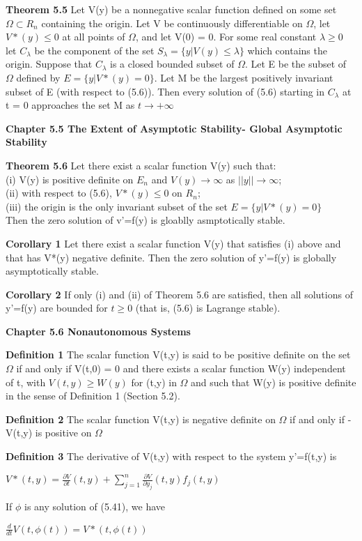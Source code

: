 \documentclass{article}
\begin{document}
\textbf {Theorem 5.5} Let V(y) be a nonnegative scalar function defined on some set $\Omega \subset R_n$ containing the origin. Let V be continuously differentiable on $\Omega$, let $V*(y) \leq 0$ at all points of $\Omega$, and let V(0) = 0. For some real constant $\lambda \geq 0$ let $C_\lambda$ be the component of the set $S_\lambda = \{y | V(y) \leq \lambda \}$ which contains the origin. Suppose that $C_\lambda$ is a closed bounded subset of $\Omega$. Let E be the subset of $\Omega$ defined by $E = \{ y | V*(y) = 0\}$. Let M be the largest positively invariant subset of E (with respect to (5.6)). Then every solution of (5.6) starting in $C_\lambda$ at t = 0 approaches the set M as $t \to + \infty$

\textbf {Chapter 5.5 The Extent of Asymptotic Stability- Global Asymptotic Stability}

\textbf {Theorem 5.6} Let there exist a scalar function V(y) such that: \\
(i) V(y) is positive definite on $E_n$ and $V(y) \to \infty$ as $||y|| \to \infty$; \\
(ii) with respect to (5.6), $V*(y) \leq 0$ on $R_n$; \\
(iii) the origin is the only invariant subset of the set $E = \{y|V*(y) = 0\}$ \\
Then the zero solution of v'=f(y) is gloablly asmptotically stable.

\textbf {Corollary 1} Let there exist a scalar function V(y) that satisfies (i) above and that has V*(y) negative definite. Then the zero solution of y'=f(y) is globally asymptotically stable. 

\textbf {Corollary 2} If only (i) and (ii) of Theorem 5.6 are satisfied, then all solutions of y'=f(y) are bounded for $t \geq 0$ (that is, (5.6) is Lagrange stable).

\textbf {Chapter 5.6 Nonautonomous Systems}

\textbf {Definition 1} The scalar function V(t,y) is said to be positive definite on the set $\Omega$ if and only if V(t,0) = 0 and there exists a scalar function W(y) independent of t, with $V(t,y) \geq W(y)$ for (t,y) in $\Omega$ and such that W(y) is positive definite in the sense of Definition 1 (Section 5.2).

\textbf {Definition 2} The scalar function V(t,y) is negative definite on $\Omega$ if and only if -V(t,y) is positive on $\Omega$

\textbf {Definition 3} The derivative of V(t,y) with respect to the system y'=f(t,y) is 
\begin{center}
$V*(t,y) = \frac{\partial V}{\partial t} (t,y) + \sum_{j=1}^n \frac{\partial V}{\partial y_j} (t,y) f_j(t,y)$
\end{center}
If $\phi$ is any solution of (5.41), we have
\begin{center}
$\frac{d}{dt} V(t, \phi(t)) = V*(t, \phi (t))$
\end{center}
\end{document}
